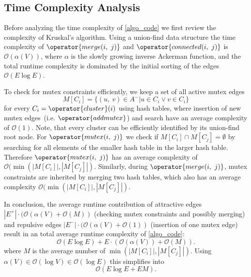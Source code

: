 
\subsection{Time Complexity Analysis}



Before analyzing the time complexity of \autoref{algo_code} we first review the complexity of Kruskal's algorithm. Using a union-find data structure the time complexity of $\operator{merge(i,~j)}$ and $\operator{connected(i,~j)}$ is $\mathcal{O}(\alpha(V))$, where $\alpha$ is the slowly growing inverse Ackerman function, and the total runtime complexity is dominated by the initial sorting of the edges $\mathcal{O}(E \log E)$\cite{cormen2009introduction}.


\noindent To check for mutex constraints efficiently, we keep a set of all active mutex edges $$ M[C_i] = \{(u,~v) \in A^- | u \in C_i \lor v \in C_i\} $$ for every $C_i = \operator{cluster}(i)$ using hash tables, where insertion of new mutex edges~(i.e. $\operator{addmutex}$) and search have an average complexity of $\mathcal{O}(1)$. Note, that every cluster can be efficiently identified by its union-find root node.
For $\operator{mutex(i,~j)}$ we check if $M[C_i] \cap M[C_j] = \emptyset$ by searching for all elements of the smaller hash table in the larger hash table. Therefore $\operator{mutex(i,~j)}$ has an average complexity of $\mathcal{O}(\min (|M[C_i]|, |M[C_j]|)$. %
Similarly, during $\operator{merge(i,~j)}$, mutex constraints are inherited  by merging two hash tables, which also has an average complexity $\mathcal{O}(\min (|M[C_i]|, |M[C_j]|)$.

\noindent In conclusion, the average runtime contribution of attractive edges $|E^{+}| \cdot (\mathcal{O}(\alpha(V) + \mathcal{O}(M))$ (checking mutex constraints and possibly merging) and repulsive edges
 $|E^{-}| \cdot (\mathcal{O}(\alpha(V) + \mathcal{O}(1)) $ (insertion of one mutex edge) result in an total average runtime complexity of \autoref{algo_code}:
 \vspace{-0.1cm}
    \begin{equation}
        \mathcal{O}(E \log E) + E \cdot (\mathcal{O}(\alpha(V)) + \mathcal{O}(M)).
    \end{equation}
where $M$ is the average number of $\min (|M[C_i]|, |M[C_j]|)$. Using $\alpha(V) \in \mathcal{O}(\log V) \in \mathcal{O}(\log E) $ this simplifies into 
    \begin{equation}
         \mathcal{O}(E \log E + EM).
    \end{equation}


